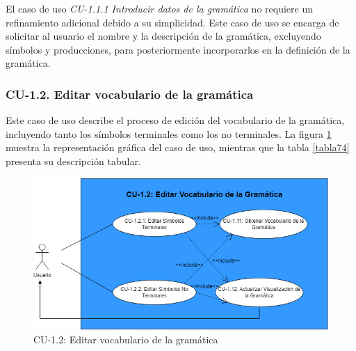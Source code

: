 El caso de uso \textit{CU-1.1.1 Introducir datos de la gramática} no requiere un refinamiento adicional debido a su simplicidad. Este caso de uso se encarga de solicitar al usuario el nombre y la descripción de la gramática, excluyendo símbolos y producciones, para posteriormente incorporarlos en la definición de la gramática.

\subsubsection{CU-1.2. Editar vocabulario de la gramática}

Este caso de uso describe el proceso de edición del vocabulario de la gramática, incluyendo tanto los símbolos terminales como los no terminales. La figura \ref{fig:CU1.2} muestra la representación gráfica del caso de uso, mientras que la tabla \ref{tabla74} presenta su descripción tabular.

  \begin{figure}[H]
       \begin{center} 
 	\includegraphics[scale=0.55]{figuras/Cap7/CU12.png}
 	\caption{CU-1.2: Editar vocabulario de la gramática}
 	\label{fig:CU1.2}
       \end{center}
   \end{figure}

